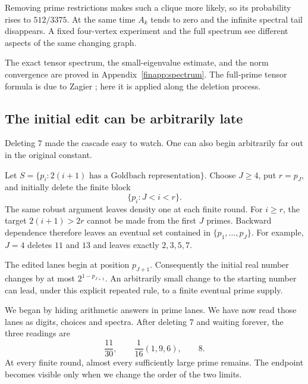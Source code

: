 Removing prime restrictions makes such a clique more
likely, so its probability rises to $512/3375$.
At the same time $A_k$ tends to zero and the infinite spectral tail
disappears.  A fixed four-vertex experiment and the full spectrum see
different aspects of the same changing graph.

The exact tensor spectrum, the small-eigenvalue estimate, and the norm
convergence are proved in Appendix~\ref{finapp:spectrum}.
The full-prime tensor formula is due to Zagier
\cite[Appendix C]{finCoprimeChain}; here it is applied along the deletion
process.

\subsection{The initial edit can be arbitrarily late}
Deleting $7$ made the cascade easy to watch.
One can also begin arbitrarily far out in the original constant.

Let $S=\{p_i:2(i+1)\text{ has a Goldbach representation}\}$.
Choose $J\ge4$, put $r=p_J$, and initially delete the finite block
\[
 \{p_i:J<i<r\}.
\]
The same robust argument leaves density one at each finite round.
For $i\ge r$, the target $2(i+1)>2r$ cannot be made from the first
$J$ primes.  Backward dependence therefore leaves an eventual set
contained in $\{p_1,\ldots,p_J\}$.
For example, $J=4$ deletes $11$ and $13$ and leaves exactly $2,3,5,7$.

The edited lanes begin at position $p_{J+1}$.
Consequently the initial real number changes by at most
$2^{1-p_{J+1}}$.
An arbitrarily small change to the starting number can lead, under
this explicit repeated rule, to a finite eventual prime supply.

We began by hiding arithmetic answers in prime lanes.
We have now read those lanes as digits, choices and spectra.
After deleting $7$ and waiting forever, the three readings are
\[
 \frac{11}{30},\qquad \frac1{16}(1,9,6),\qquad 8.
\]
At every finite round, almost every sufficiently large prime remains.
The endpoint becomes visible only when we change the order of the
two limits.
